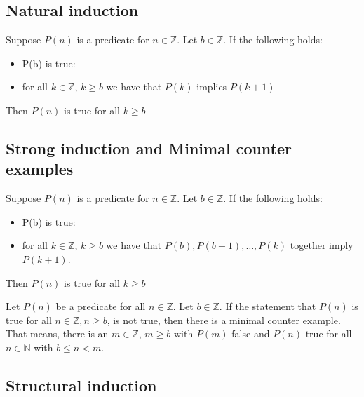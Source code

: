 \subsection{Natural induction}
\begin{principle}
    Suppose $ P(n) $ is a predicate for $n \in \mathbb{Z}$. Let $ b \in \mathbb{Z} $.
    If the following holds:
    \begin{itemize}
        \item P(b) is true:
        \item for all $ k \in \mathbb{Z} $, $ k \ge b $ we have that $P(k)$ implies
        $ P(k+1) $
    \end{itemize}
    Then $ P(n) $ is true for all $k \ge b$
\end{principle}

\subsection{Strong induction and Minimal counter examples}

\begin{principle}
    Suppose $ P(n) $ is a predicate for $n \in \mathbb{Z}$. Let $ b \in \mathbb{Z} $.
    If the following holds:
    \begin{itemize}
        \item P(b) is true:
        \item for all $ k \in \mathbb{Z} $, $ k \ge b $ we have that
        $P(b), P(b+1), \dots, P(k)$ together imply $P(k+1)$.
    \end{itemize}
    Then $ P(n) $ is true for all $k \ge b$
\end{principle}

\begin{principle}
    Let $P(n)$ be a predicate for all $n \in \mathbb{Z}$. Let $b \in \mathbb{Z}$.
    If the statement that $P(n)$ is true for all $n \in \mathbb{Z},n \ge b$, is
    not true, then there is a minimal counter example. That means, there is an
    $m \in \mathbb{Z}$, $m \ge b$ with $P(m)$ false and $P(n)$ true for all
    $n \in \mathbb{N}$ with $b \le n < m$.

\end{principle}


\subsection{Structural induction}

